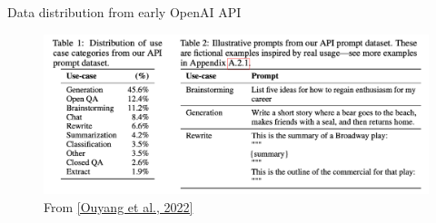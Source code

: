 \documentclass[usenames,dvipsnames,notes,11pt,aspectratio=169,hyperref={colorlinks=true, linkcolor=blue}]{beamer}
\begin{document}
\begin{frame}
    {Data distribution from early OpenAI API}
            \begin{figure}
        \includegraphics[width=\textwidth]{figures/user-prompt}
            \caption{From \href{https://arxiv.org/pdf/2203.02155.pdf}{[Ouyang et al., 2022]}}
            \end{figure}
\end{frame}
\end{document}
